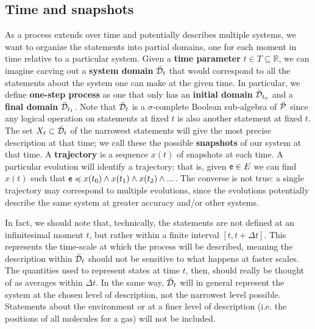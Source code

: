 \documentclass[letterpaper]{article}
\begin{document}
\subsection{Time and snapshots}

As a process extends over time and potentially describes multiple systems, we want to organize the statements into partial domains, one for each moment in time relative to a particular system. Given a \textbf{time parameter} $t \in T \subseteq \mathbb{R}$, we can imagine carving out a \textbf{system domain} $\tdomain_t$ that would correspond to all the statements about the system one can make at the given time. In particular, we define \textbf{one-step process} as one that only has an \textbf{initial domain} $\tdomain_{t_0}$ and a \textbf{final domain} $\tdomain_{t_1}$. Note that $\tdomain_t$ is a $\sigma$-complete Boolean sub-algebra of $\tdomain[P]$ since any logical operation on statements at fixed $t$ is also another statement at fixed $t$. The set $X_t \subset \tdomain_t$ of the narrowest statements will give the most precise description at that time; we call these the  possible \textbf{snapshots} of our system at that time. A \textbf{trajectory} is a sequence $x(t)$ of snapshots at each time. A particular evolution will identify a trajectory: that is, given $\stmt[e] \in E$ we can find $x(t)$ such that $\stmt[e] \narrower x(t_0) \AND x(t_1) \AND x(t_2) \AND ... $. The converse is not true: a single trajectory may correspond to multiple evolutions, since the evolutions potentially describe the same system at greater accuracy and/or other systems.

In fact, we should note that, technically, the statements are not defined at an infinitesimal moment $t$, but rather within a finite interval $[t, t + \Delta t]$. This represents the time-scale at which the process will be described, meaning the description within $\tdomain_t$ should not be sensitive to what happens at faster scales. The quantities used to represent states at time $t$, then, should really be thought of as averages within $\Delta t$. In the same way, $\tdomain_t$ will in general represent the system at the chosen level of description, not the narrowest level possible. Statements about the environment or at a finer level of description (i.e. the positions of all molecules for a gas) will not be included.
\end{document}
